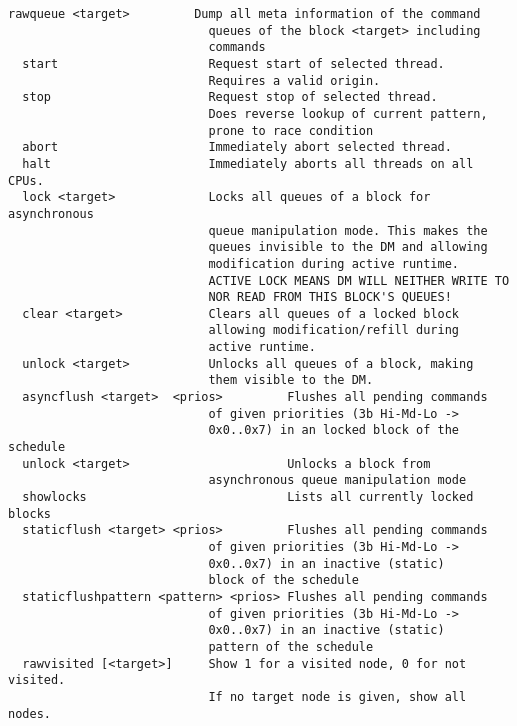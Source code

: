 \begin{lstlisting}[style = helptext]
  rawqueue <target>         Dump all meta information of the command
                            queues of the block <target> including
                            commands
  start                     Request start of selected thread.
                            Requires a valid origin.
  stop                      Request stop of selected thread.
                            Does reverse lookup of current pattern,
                            prone to race condition
  abort                     Immediately abort selected thread.
  halt                      Immediately aborts all threads on all CPUs.
  lock <target>             Locks all queues of a block for asynchronous
                            queue manipulation mode. This makes the
                            queues invisible to the DM and allowing
                            modification during active runtime.
                            ACTIVE LOCK MEANS DM WILL NEITHER WRITE TO
                            NOR READ FROM THIS BLOCK'S QUEUES!
  clear <target>            Clears all queues of a locked block
                            allowing modification/refill during
                            active runtime.
  unlock <target>           Unlocks all queues of a block, making
                            them visible to the DM.
  asyncflush <target>  <prios>         Flushes all pending commands
                            of given priorities (3b Hi-Md-Lo ->
                            0x0..0x7) in an locked block of the schedule
  unlock <target>                      Unlocks a block from
                            asynchronous queue manipulation mode
  showlocks                            Lists all currently locked blocks
  staticflush <target> <prios>         Flushes all pending commands
                            of given priorities (3b Hi-Md-Lo ->
                            0x0..0x7) in an inactive (static)
                            block of the schedule
  staticflushpattern <pattern> <prios> Flushes all pending commands
                            of given priorities (3b Hi-Md-Lo ->
                            0x0..0x7) in an inactive (static)
                            pattern of the schedule
  rawvisited [<target>]     Show 1 for a visited node, 0 for not visited.
                            If no target node is given, show all nodes.


\end{lstlisting}
